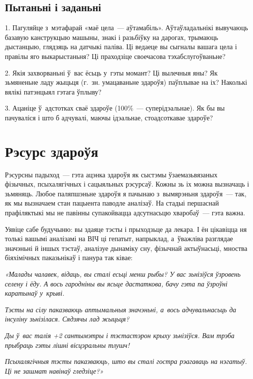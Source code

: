 \subsection*{Пытаньні і заданьні}

1. Пагуляйце з~мэтафарай «маё цела~--- аўтамабіль». Аўтаўладальнікі вывучаюць базавую канструкцыю машыны, знакі і разьбіўку на дарогах, трымаюць дыстанцыю, глядзяць на датчыкі паліва. Ці ведаеце вы сыгналы вашага цела і правілы яго выкарыстаньня? Ці праходзіце своечасова тэхабслугоўваньне?

2. Якія захворваньні ў~вас ёсьць у~гэты момант? Ці вылечныя яны? Як зьмяненьне ладу жыцьця (г.~зн. умацаваньне здароўя) паўплывае на іх? Наколькі вялікі патэнцыял гэтага ўплыву?

3. Ацаніце ў~адстотках сваё здароўе (100\%~--- суперідэальнае). Як бы вы пачуваліся і што б адчувалі, маючы ідэальнае, стоадсоткавае здароўе?


\section{Рэсурс здароўя}

Рэсурсны падыход~--- гэта ацэнка здароўя як сыстэмы ўзаемазьвязаных фізычных, псыхалягічных і сацыяльных рэсурсаў. Кожны зь іх можна вызначаць і зьмяняць. Любое паляпшэньне здароўя я пачынаю з~вымярэньня здароўя~--- так, як мы вызначаем стан пацыента паводле аналізаў. На стадыі першаснай прафіляктыкі мы не павінны супакойвацца адсутнасьцю хваробаў~--- гэта важна.

Уявіце сабе будучыню: вы здаяце тэсты і прыходзьце да лекара. І ён цікавіцца ня толькі вашымі аналізамі на ВІЧ ці гепатыт, напрыклад, а~ўважліва разглядае значэньні й іншых тэстаў, аналізуе дынаміку сну, фізычнай актыўнасьці, мноства біяхімічных паказьнікаў і панура так ківае:

\emph{«Малады чалавек, відаць, вы сталі есьці менш рыбы? У вас зьнізіўся ўзровень селену і ёду. А вось гародніны вы ясьце дастаткова, бачу гэта па ўзроўні каратынаў у~крыві.}

\emph{Тэсты на сілу паказваюць аптымальныя значэньні, а~вось адчувальнасьць да інсуліну зьнізілася. Сядзячы лад жыцьця?}

\emph{Ды ў~вас талія +2 сантымэтры і тэстастэрон крыху зьнізіўся. Вам трэба прыбраць гэты лішні вісцэральны тлушч!}

\emph{Псыхалягічныя тэсты паказваюць, што вы сталі гостра рэагаваць на нэгатыў. Ці не зашмат навінаў гледзіце?»}

